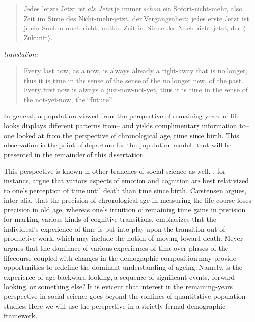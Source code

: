  \FloatBarrier
 
\begin{singlespace}
\begin{quote}
Jedes letzte Jetzt ist \textit{als Jetzt} je immer \textit{schon} ein
Sofort-nicht-mehr, also Zeit im Sinne des Nicht-mehr-jetzt, der Vergangenheit;
jedes erste Jetzt ist je ein Soeben-noch-nicht, mithin Zeit im Sinne des
Noch-nicht-jetzt, der $\langle$Zukunft$\rangle$.
\citep[p424][]{heidegger1977sein}
\end{quote}
\textit{translation:}
\begin{quote}
Every last now, as a now, is always already a right-away that is no longer, thus
it is time in the sense of the sense of the no longer now, of the past. Every
first now is always a just-now-not-yet, thus it is time in the sense of the
not-yet-now, the ``future''. \citep{stambaugh1996being}
\end{quote}
\end{singlespace}

In general, a population viewed from the
perspective of remaining years of life looks diaplays different patterns 
from-- and yields complimentary information to-- one looked at from the
perspective of chronological age, time since birth. This observation is the
point of departure for the population models that will be presented in the remainder of this
dissertation. 

This perspective is known in other branches of social science as well.
 \citet{carstensen2006influence,carstensen1999taking}, 
for instance, argue that various aspects of emotion and cognition are best 
relativized to one's perception of time until
death than time since birth. Carstensen argues, inter alia, that the precision
of chronological age in measuring the life course loses precision in old age,
whereas one's intuition of remaining time gains in precision for marking various
kinds of cognitive transitions. \citet{meyer2008altern} emphasizes that the
individual's experience of time is put into play upon the transition out of
productive work, which may include the notion of moving toward death. Meyer
argues that the dominace of various experiences of time over phases of the
lifecourse coupled with changes in the demographic composition may provide
opportunities to redefine the dominant understanding of ageing. Namely, is
the experience of age backward-looking, a sequence of significant events,
forward-looking, or something else? It is evident that interest in the
remaining-years perspective in social science goes beyond the
confines of quantitative population studies. Here we will use the perspective in
a strictly formal demographic framework.

